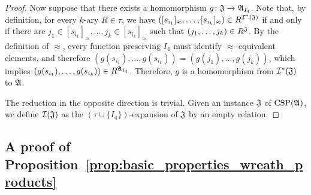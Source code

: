 \begin{proof}
Now suppose that there exists a homomorphism $g\colon \mathfrak{J}\rightarrow\mathfrak{A}_{I_4}$. 
%
Note that, by definition, for every $k$-ary $R\in\tau$, we have $([s_{i_1}]_{\approx},\dots, [s_{i_k}]_{\approx}) \in R^{\mathcal{I}^{\ast}(\mathfrak{J})}$ if and only if there are $j_1\in [s_{i_1}]_{\approx}, \dots, j_k\in [s_{i_k}]_{\approx}$ such that  $(j_1,\dots,j_k) \in R^{\mathfrak{J}}$.
%
By the definition of $\approx$, every function preserving $I_4$ must identify $\approx$-equivalent elements, and therefore $(g(s_{i_1}),\dots,g(s_{i_k}))=(g(j_1),\dots,g(j_k))$, which implies $(g(s_{i_1}),\dots,g(s_{i_k})) \in  R^{\mathfrak{A}_{I_4}}$. 
%
Therefore, $g$ is a homomorphism from $\mathcal{I}^{\ast}(\mathfrak{J})$ to $\mathfrak{A}$.

The reduction in the opposite direction is trivial. Given an instance $\mathfrak{J}$ of $\mathrm{CSP}(\mathfrak{A})$, we define $\mathcal{I}(\mathfrak{J})$ as the $(\tau\cup \{I_4\})$-expansion of $\mathfrak{J}$ by an empty relation.
\end{proof}
 
\subsection{A proof of Proposition~\ref{prop:basic_properties_wreath_products}}

\wreathproducts*
 
 
 
